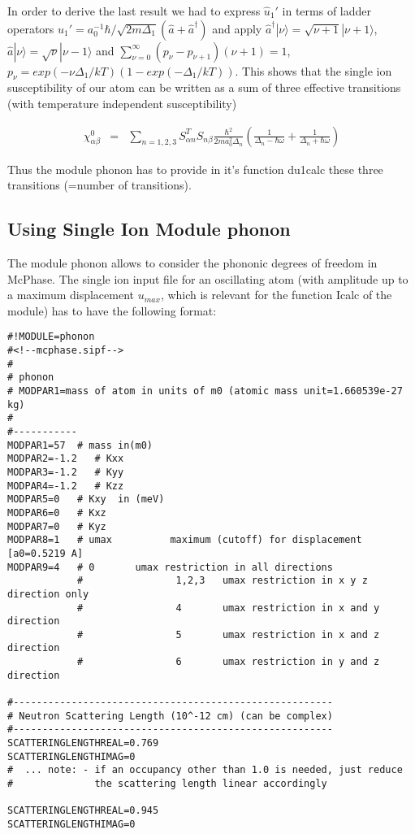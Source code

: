 In order to derive the last result we had to express $\hat u_1'$ in terms of ladder  operators
$\hat u_1'=a_0^{-1} \hbar/\sqrt{2m\Delta_1}(\hat a+\hat a^{\dagger})$ and  apply $\hat a^{\dagger}|\nu\rangle=\sqrt{\nu+1}|\nu+1\rangle$,
$\hat a|\nu\rangle=\sqrt{\nu}|\nu-1\rangle$ and $\sum_{\nu=0}^{\infty}(p_{\nu}-p_{\nu+1})(\nu+1)=1$,
$p_{\nu}=exp(-\nu\Delta_1/kT)(1-exp(-\Delta_1/kT))$. This shows that the single ion susceptibility
of our atom can be written as a sum of three effective transitions (with temperature independent
susceptibility)

\begin{eqnarray}
\chi^0_{\alpha\beta}
&=& \sum_{n=1,2,3} S^T_{\alpha n}S_{n\beta}\frac{\hbar^2}{2ma_0^2\Delta_n}
\left(\frac{1}{\Delta_n-\hbar\omega}+\frac{1}{\Delta_n+\hbar\omega}\right )
\end{eqnarray}

Thus the module {\prg phonon} has to provide in it's function {\prg du1calc} these three
transitions (=number of transitions).

\subsection{Using Single Ion Module {\prg phonon}}

The module {\prg phonon} allows to consider the phononic degrees of freedom in {\prg McPhase}.
The single ion input file for an oscillating atom (with amplitude 
up to a maximum displacement $u_{max}$, which is relevant for the function {\prg Icalc} of the
module) has to have the following format:

\begin{verbatim}
#!MODULE=phonon
#<!--mcphase.sipf-->
#
# phonon
# MODPAR1=mass of atom in units of m0 (atomic mass unit=1.660539e-27 kg)
#
#-----------
MODPAR1=57  # mass in(m0)
MODPAR2=-1.2   # Kxx
MODPAR3=-1.2   # Kyy
MODPAR4=-1.2   # Kzz
MODPAR5=0   # Kxy  in (meV)
MODPAR6=0   # Kxz
MODPAR7=0   # Kyz
MODPAR8=1   # umax          maximum (cutoff) for displacement [a0=0.5219 A]
MODPAR9=4   # 0       umax restriction in all directions
            #                1,2,3   umax restriction in x y z direction only
            #                4       umax restriction in x and y direction
            #                5       umax restriction in x and z direction
            #                6       umax restriction in y and z direction

#-------------------------------------------------------
# Neutron Scattering Length (10^-12 cm) (can be complex)
#-------------------------------------------------------
SCATTERINGLENGTHREAL=0.769
SCATTERINGLENGTHIMAG=0
#  ... note: - if an occupancy other than 1.0 is needed, just reduce 
#              the scattering length linear accordingly

SCATTERINGLENGTHREAL=0.945
SCATTERINGLENGTHIMAG=0
\end{verbatim}

